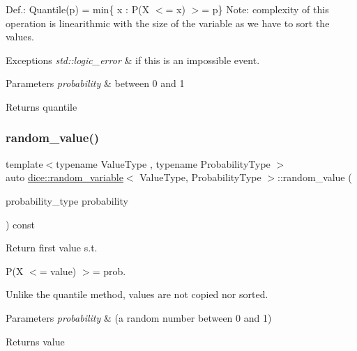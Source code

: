 Def.\+: Quantile(p) = min\{ x \+: P(X $<$= x) $>$= p\} Note\+: complexity of this operation is linearithmic with the size of the variable as we have to sort the values.


\begin{DoxyExceptions}{Exceptions}
{\em std\+::logic\+\_\+error} & if this is an impossible event.\\
\hline
\end{DoxyExceptions}

\begin{DoxyParams}{Parameters}
{\em probability} & between 0 and 1\\
\hline
\end{DoxyParams}
\begin{DoxyReturn}{Returns}
quantile 
\end{DoxyReturn}
\mbox{\label{classdice_1_1random__variable_a559e5f26fcd39e1f68b22681aab90664}} 
\subsubsection{\texorpdfstring{random\+\_\+value()}{random\_value()}}
{\footnotesize\ttfamily template$<$typename Value\+Type , typename Probability\+Type $>$ \\
auto \mbox{\hyperlink{classdice_1_1random__variable}{dice\+::random\+\_\+variable}}$<$ Value\+Type, Probability\+Type $>$\+::random\+\_\+value (\begin{DoxyParamCaption}\item[{probability\+\_\+type}]{probability }\end{DoxyParamCaption}) const\hspace{0.3cm}{\ttfamily [inline]}}



Return first value s.\+t. 

P(X $<$= value) $>$= prob.

Unlike the quantile method, values are not copied nor sorted.


\begin{DoxyParams}{Parameters}
{\em probability} & (a random number between 0 and 1)\\
\hline
\end{DoxyParams}
\begin{DoxyReturn}{Returns}
value 
\end{DoxyReturn}
\mbox{\label{classdice_1_1random__variable_a79723edbb8e79a914f7b5ea37a13ed9a}} 
